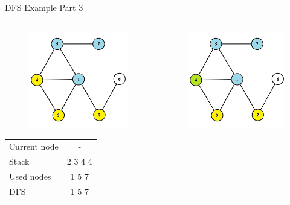 \documentclass[aspectratio=169]{beamer}%
\begin{document}
\begin{frame}{DFS Example Part 3}
\begin{columns}
\begin{column}{0.32\textwidth}
\begin{figure}[!ht]
                \includegraphics[width=0.9\linewidth]{dfs 8.png}
            \end{figure}
            \begin{table}[ht]
                \centering
                \begin{tabular}{l c}
                    Current node & -\\
                    Stack & 2 3 4 4\\ 
                    Used nodes & 1 5 7\\
                    DFS & 1 5 7
                \end{tabular}
            \end{table}
        \end{column}
        \hfill
        \begin{column}{0.32\textwidth}
            \begin{figure}[!ht]
                \centering
                \includegraphics[width=0.9\linewidth]{dfs 9.png}

\end{figure}
\end{column}
\end{columns}
\end{frame}
\end{document}
